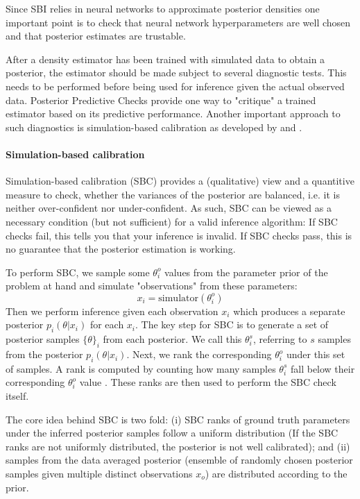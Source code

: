 \documentclass{aa}
\begin{document}
\begin{appendix}
Since SBI relies in neural networks to approximate posterior densities one important point is to check that neural network hyperparameters are well chosen and that posterior estimates are trustable.

After a density estimator has been trained with simulated data to obtain a posterior, the estimator should be made subject to several diagnostic tests. This needs to be performed before being used for inference given the actual observed data. Posterior Predictive Checks provide one way to "critique" a trained estimator based on its predictive performance. Another important approach to such diagnostics is simulation-based calibration as developed by \citet{Cook2006} and \citet{Talts2018}. 

\paragraph{Simulation-based calibration}
Simulation-based calibration (SBC) provides a (qualitative) view and a quantitive measure to check, whether the variances of the posterior are balanced, i.e. it is neither over-confident nor under-confident. As such, SBC can be viewed as a necessary condition (but not sufficient) for a valid inference algorithm: If SBC checks fail, this tells you that your inference is invalid. If SBC checks pass, this is no guarantee that the posterior estimation is working.

To perform SBC, we sample some $\theta_i^o$ values from the parameter prior of the problem at hand and simulate "observations" from these parameters: 
\begin{equation}
    x_i = \text{simulator}(\theta_i^o)
\end{equation}
Then we perform inference given each observation $x_i$ which produces a separate posterior $p_i(\theta|x_i)$ for each $x_i$. The key step for SBC is to generate a set of posterior samples $\{\theta\}_i$ from each posterior. We call this $\theta_i^s$, referring to $s$ samples from the posterior $p_i(\theta|x_i)$. Next, we rank the corresponding $\theta_i^o$ under this set of samples. A rank is computed by counting how many samples $\theta_i^s$ fall below their corresponding $\theta_i^o$ value \citep[see section 4.1 in][]{Talts2018}. These ranks are then used to perform the SBC check itself.

The core idea behind SBC is two fold: (i) SBC ranks of ground truth parameters under the inferred posterior samples follow a uniform distribution (If the SBC ranks are not uniformly distributed, the posterior is not well calibrated); and (ii) samples from the data averaged posterior (ensemble of randomly chosen posterior samples given multiple distinct observations $x_o$) are distributed according to the prior.


\end{appendix}
\end{document}
